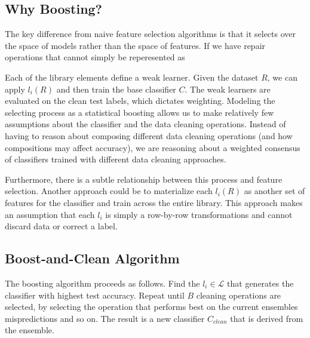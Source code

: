 \subsection{Why Boosting?}
The key difference from naive feature selection algorithms is that it selects over the space of models rather than the space of features.
If we have repair operations that cannot simply be reperesented as 

Each of the library elements define a weak learner.
Given the dataset $R$, we can apply $l_i(R)$ and then train the base classifier $C$. 
The weak learners are evaluated on the clean test labels, which dictates weighting.
Modeling the selecting process as a statistical boosting allows us to make relatively few assumptions about the classifier and the data cleaning operations. 
Instead of having to reason about composing different data cleaning operations (and how compositions may affect accuracy), we are reasoning about a weighted consensus of classifiers trained with different data cleaning approaches.

Furthermore, there is a subtle relationship between this process and feature selection.
Another approach could be to materialize each $l_i(R)$ as another set of features for the classifier and train across the entire library.
This approach makes an assumption that each $l_i$ is simply a row-by-row transformations and cannot discard data or correct a label.

\subsection{Boost-and-Clean Algorithm}\label{s:boostalg}
The boosting algorithm proceeds as follows.
Find the $l_i \in \mathcal{L}$ that generates the classifier with highest test accuracy.
Repeat until $B$ cleaning operations are selected, by selecting the operation that performs best on the current ensembles mispredictions and so on.
The result is a new classifier $C_{clean}$ that is derived from the ensemble.

